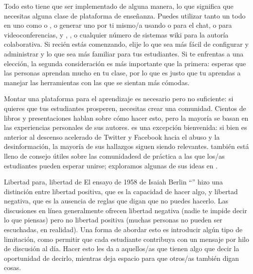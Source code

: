 Todo esto tiene que ser implementado de alguna manera,
lo que significa que necesitas alguna clase de plataforma de enseñanza.
Puedes utilizar tanto un  todo en uno
como  o ,
o generar uno por ti mismo/a 
usando  o  para el chat,
o  para videoconferencias,
y ,
,
o cualquier número de sistemas wiki para la autoría colaborativa.
Si recién estás comenzando,
elije lo que sea más fácil de configurar y administrar
y lo que sea más familiar para tus estudiantes.
Si te enfrentas a una elección,
la segunda consideración es más importante que la primera:
esperas que las personas aprendan mucho en tu clase,
por lo que es justo que tu aprendas a manejar las herramientas con las que se sientan más cómodas.

Montar una plataforma para el aprendizaje es necesario pero no suficiente:
si quieres que tus estudiantes prosperen,
necesitas crear una comunidad.
Cientos de libros y presentaciones hablan sobre cómo hacer esto,
pero la mayoría se basan en las experiencias personales de sus autores.
\cite{Krau2016} es una excepción bienvenida:
si bien es anterior al descenso acelerado de Twitter y Facebook hacia el abuso y la desinformación,
la mayoría de sus hallazgos siguen siendo relevantes.
\cite{Foge2005} también está lleno de consejo útiles
sobre las comunidadesd de práctica a las que los/as estudiantes pueden esperar unirse;
exploramos algunas de sus ideas en .

\begin{aside}{Libertad para, libertad de}
  El ensayo de 1958 de Isaiah Berlin
  ``''
  hizo una distinción entre libertad positiva,
  que es la capacidad de hacer algo,
  y libertad negativa,
  que es la ausencia de reglas que digan que no puedes hacerlo.
  Las discusiones en línea generalmente ofrecen libertad negativa
  (nadie te impide decir lo que piensas)
  pero no libertad positiva
  (muchas personas no pueden ser escuchadas, en realidad).
  Una forma de abordar esto es introducir algún tipo de limitación,
  como permitir que cada estudiante contribuya con un mensaje por hilo de discusión al día.
  Hacer esto les da a aquellos/as que tienen algo que decir la oportunidad de decirlo,
  mientras deja espacio para que otros/as también digan cosas.
\end{aside}

